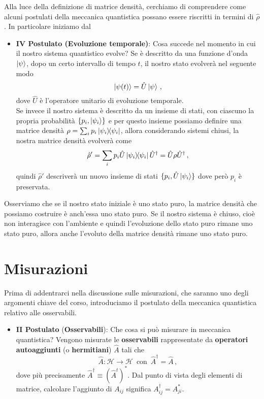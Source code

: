 \noindent Alla luce della definizione di matrice densità, cerchiamo di comprendere come alcuni postulati della meccanica quantistica possano essere riscritti in termini di $\hat \rho$. In particolare iniziamo dal
\begin{itemize}
    \item \textbf{IV Postulato (Evoluzione temporale)}: Cosa succede nel momento in cui il nostro sistema quantistico evolve? Se è descritto da una funzione d'onda $\ket \psi$, dopo un certo intervallo di tempo $t$, il nostro stato evolverà nel seguente modo
    \begin{equation*}
        \ket{\psi(t)}=\hat U\ket \psi \, ,
    \end{equation*}
    dove $\hat U$ è l'operatore unitario di evoluzione temporale.\\
    Se invece il nostro sistema è descritto da un insieme di stati, con ciascuno la propria probabilità $\{p_i, \ket{\psi_i}\}$ e per questo insieme possiamo definire una matrice densità $\rho=\sum_i p_i\op{\psi_i}{\psi_i}$, allora considerando sistemi chiusi, la nostra matrice densità evolverà come
    \begin{equation*}
        \hat \rho'=\sum_i p_i \hat U\op{\psi_i}{\psi_i}\hat U^\dagger = \hat U \rho \hat U^\dagger \, ,
    \end{equation*}
    quindi $\hat \rho'$ descriverà un nuovo insieme di stati  $\{p_i, \hat U\ket{\psi_i}\}$ dove però $p_i$ è preservata.\\
\end{itemize}
Osserviamo che se il nostro stato iniziale è uno stato puro, la matrice densità che possiamo costruire è anch'essa uno stato puro. Se il nostro sistema è chiuso, cioè non interagisce con l'ambiente e quindi l'evoluzione dello stato puro rimane uno stato puro, allora anche l'evoluto della matrice densità rimane uno stato puro.

\section{Misurazioni}\label{misurazioni_proiettive}
Prima di addentrarci nella discussione sulle misurazioni, che saranno uno degli argomenti chiave del corso, introduciamo il postulato della meccanica quantistica relativo alle osservabili.
\begin{itemize}
    \item \textbf{II Postulato} (\textbf{Osservabili}): Che cosa si può misurare in meccanica quantistica? Vengono misurate le \textbf{osservabili} rappresentate da \textbf{operatori autoaggiunti} (o \textbf{hermitiani}) $\hat{A}$ tali che
    \begin{equation*}
        \hat{A}: \mathcal{H}\rightarrow \mathcal{H} \, \text{ con } \, \hat{A}^\dagger = \hat{A} \, ,
    \end{equation*}
    dove più precisamente $\hat{A}^\dagger \equiv (\hat{A}^t)^\ast$. Dal punto di vista degli elementi di matrice, calcolare l'aggiunto di $A_{ij}$ significa $A^\dagger_{ij} = A^\ast_{ji}$.
\end{itemize}

